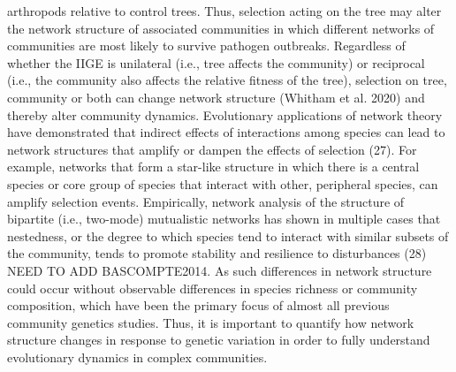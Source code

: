 \documentclass{article}
\begin{document}
arthropods relative to control trees. Thus, selection acting on the
tree may alter the network structure of associated communities in
which different networks of communities are most likely to survive
pathogen outbreaks. Regardless of whether the IIGE is unilateral
(i.e., tree affects the community) or reciprocal (i.e., the community
also affects the relative fitness of the tree), selection on tree,
community or both can change network structure (Whitham et al. 2020)
and thereby alter community dynamics.  Evolutionary applications of
network theory have demonstrated that indirect effects of interactions
among species can lead to network structures %
%
%
that amplify or dampen the effects of selection (27). For example,
networks that form a star-like structure in which there is a central
species or core group of species that interact with other, peripheral
species, can amplify selection events. Empirically, network analysis
of the structure of bipartite (i.e., two-mode) mutualistic networks
has shown in multiple cases that nestedness, or the degree to which
species tend to interact with similar subsets of the community, tends
to promote stability and resilience to disturbances (28) NEED TO ADD %
BASCOMPTE2014. As such differences in network structure could occur
without observable differences in species richness or community
composition, which have been the primary focus of almost all previous
community genetics studies. Thus, it is important to quantify how
network structure changes in response to genetic variation in order to
fully understand evolutionary dynamics in complex communities.
\end{document}

